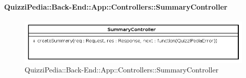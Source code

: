 \paragraph{QuizziPedia::Back-End::App::Controllers::SummaryController}
\label{QuizziPedia::Back-End::App::Controllers::SummaryController}
\begin{figure}[ht]
	\centering
	\includegraphics[scale=0.45]{UML/Classi/Back-End/QuizziPedia_Back-End_App_Controllers_SummaryController.png}
	\caption{QuizziPedia::Back-End::App::Controllers::SummaryController}
\end{figure}
\FloatBarrier

